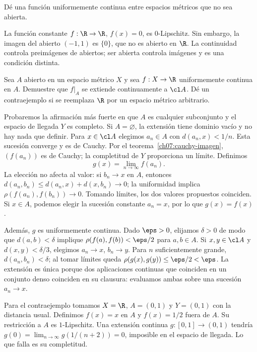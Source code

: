 \begin{ejercicio}
Dé una función uniformemente continua entre espacios métricos que no sea abierta.
\end{ejercicio}
\begin{solucion}
La función constante $f:\R\to\R$, $f(x)=0$, es $0$-Lipschitz. Sin embargo, la imagen del abierto $(-1,1)$ es $\{0\}$, que no es abierto en $\R$. La continuidad controla preimágenes de abiertos; ser abierta controla imágenes y es una condición distinta.
\end{solucion}

\begin{ejercicio}\label{ch07:ej-extension}
Sea $A$ abierto en un espacio métrico $X$ y sea $f:X\to\R$ uniformemente continua en $A$. Demuestre que $f|_A$ se extiende continuamente a $\cl A$. Dé un contraejemplo si se reemplaza $\R$ por un espacio métrico arbitrario.
\end{ejercicio}
\begin{solucion}
Probaremos la afirmación más fuerte en que $A$ es cualquier subconjunto y el espacio de llegada $Y$ es completo. Si $A=\varnothing$, la extensión tiene dominio vacío y no hay nada que definir. Para $x\in\cl A$ elegimos $a_n\in A$ con $d(a_n,x)<1/n$. Esta sucesión converge y es de Cauchy. Por el teorema~\ref{ch07:cauchy-imagen}, $(f(a_n))$ es de Cauchy; la completitud de $Y$ proporciona un límite. Definimos
\[
 g(x)=\lim_{n\to\infty}f(a_n).
\]
La elección no afecta al valor: si $b_n\to x$ en $A$, entonces $d(a_n,b_n)\leq d(a_n,x)+d(x,b_n)\to0$; la uniformidad implica $\rho(f(a_n),f(b_n))\to0$. Tomando límites, los dos valores propuestos coinciden. Si $x\in A$, podemos elegir la sucesión constante $a_n=x$, por lo que $g(x)=f(x)$.

Además, $g$ es uniformemente continua. Dado $\eps>0$, elijamos $\delta>0$ de modo que $d(a,b)<\delta$ implique $\rho(f(a),f(b))<\eps/2$ para $a,b\in A$. Si $x,y\in\cl A$ y $d(x,y)<\delta/3$, elegimos $a_n\to x$, $b_n\to y$. Para $n$ suficientemente grande, $d(a_n,b_n)<\delta$; al tomar límites queda $\rho(g(x),g(y))\leq\eps/2<\eps$. La extensión es única porque dos aplicaciones continuas que coinciden en un conjunto denso coinciden en su clausura: evaluamos ambas sobre una sucesión $a_n\to x$.

Para el contraejemplo tomamos $X=\R$, $A=(0,1)$ y $Y=(0,1)$ con la distancia usual. Definimos $f(x)=x$ en $A$ y $f(x)=1/2$ fuera de $A$. Su restricción a $A$ es $1$-Lipschitz. Una extensión continua $g:[0,1]\to(0,1)$ tendría $g(0)=\lim_{n\to\infty}g(1/(n+2))=0$, imposible en el espacio de llegada. Lo que falla es su completitud.
\end{solucion}

